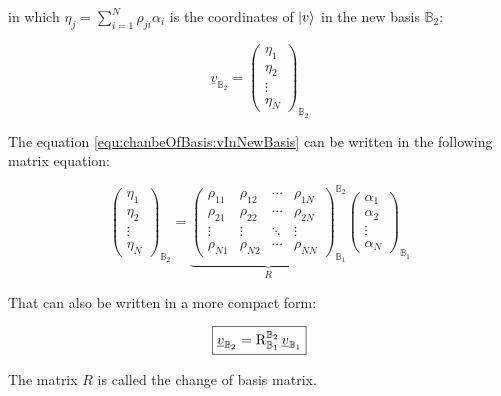 in which $\eta_j = \sum_{i=1}^{N}\rho_{ji} \alpha_i $ is the coordinates of $ \ket{v} $ in the new basis $\mathbb{B}_2$:

\begin{equation*}
	\underline{v}_{\mathbb{B}_2} = \begin{pmatrix}
		\eta_1 \\
		\eta_2 \\
		\vdots \\
		\eta_N
	\end{pmatrix}_{\mathbb{B}_2}
\end{equation*}


The equation \ref{equ:chanbeOfBasis:vInNewBasis} can be written in the following matrix equation:

\begin{equation}
	\begin{pmatrix}
		\eta_1 \\
		\eta_2 \\
		\vdots \\
		\eta_N
	\end{pmatrix}_{\mathbb{B}_2} = 
	\underbrace{\begin{pmatrix}
			\rho_{11} & \rho_{12} & \cdots & \rho_{1N}\\
			\rho_{21} & \rho_{22} & \cdots & \rho_{2N}\\
			\vdots    & \vdots    & \ddots & \vdots\\
			\rho_{N1} & \rho_{N2} & \cdots & \rho_{NN} 
		\end{pmatrix}_{\mathbb{B}_1}^{\mathbb{B}_2}}_{R}
	\begin{pmatrix}
		\alpha_1 \\
		\alpha_2 \\
		\vdots \\
		\alpha_N
	\end{pmatrix}_{\mathbb{B}_1} 
\end{equation}

That can also be written in a more compact form:

\begin{LARGE}
	\begin{equation}
		\boxed{
			\underline{v}_{\mathbb{B}_2} = \operatorname{R}_{\mathbb{B}_1}^{\mathbb{B}_2} \underline{v}_{\mathbb{B}_1}
		}
	\end{equation}
	\label{equ:changeOfBasis_compact}
\end{LARGE}

The matrix $R$ is called the change of basis matrix. \newline

